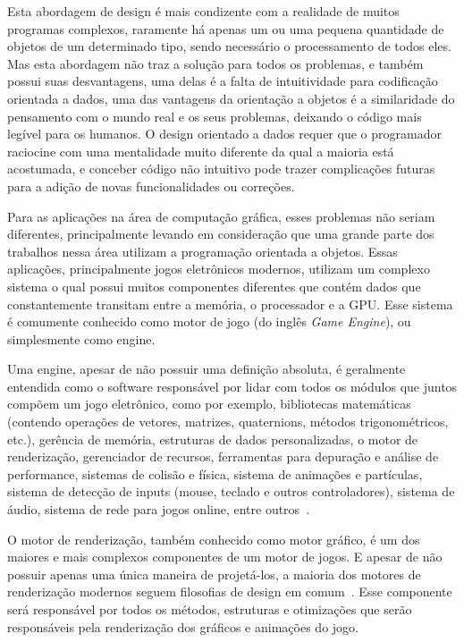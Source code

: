 \documentclass[11pt]{article}
\begin{document}
Esta abordagem de design é mais condizente com a realidade de muitos programas complexos, raramente há apenas um ou uma pequena 
quantidade de objetos de um determinado tipo, sendo necessário o processamento de todos eles. Mas esta abordagem não traz a 
solução para todos os problemas, e também possui suas desvantagens, uma delas é a falta de intuitividade para codificação 
orientada a dados, uma das vantagens da orientação a objetos é a similaridade do pensamento com o mundo real e os seus 
problemas, deixando o código mais legível para os humanos. O design orientado a dados requer que o programador raciocine com 
uma mentalidade muito diferente da qual a maioria está acostumada, e conceber código não intuitivo pode trazer complicações 
futuras para a adição de novas funcionalidades ou correções.

Para as aplicações na área de computação gráfica, esses problemas não seriam diferentes, principalmente levando em 
consideração que uma grande parte dos trabalhos nessa área utilizam a programação orientada a objetos. Essas aplicações, 
principalmente jogos eletrônicos modernos, utilizam um complexo sistema o qual possui muitos componentes diferentes que 
contém dados que constantemente transitam entre a memória, o processador e a GPU. Esse sistema é comumente conhecido 
como motor de jogo (do inglês \textit{Game Engine}), ou simplesmente como engine.

Uma engine, apesar de não possuir uma definição absoluta, é geralmente entendida como o software responsável por lidar com 
todos os módulos que juntos compõem um jogo eletrônico, como por exemplo, bibliotecas matemáticas (contendo operações de vetores, 
matrizes, quaternions, métodos trigonométricos, etc.), gerência de memória, 
estruturas de dados personalizadas, o motor de renderização, gerenciador de recursos, ferramentas para depuração e análise de performance, sistemas 
de colisão e física, sistema de animações e partículas, sistema de detecção de inputs (mouse, teclado e outros controladores),
sistema de áudio, sistema de rede para jogos online, entre outros~\cite{gregory2009game}.

O motor de renderização, também conhecido como motor gráfico, é um dos maiores e mais complexos componentes de um motor de 
jogos. E apesar de não possuir apenas uma única maneira de projetá-los, a maioria dos motores de renderização modernos 
seguem filosofias de design em comum~\cite{gregory2009game}. Esse componente será responsável por todos os métodos, 
estruturas e otimizações que serão responsáveis pela renderização dos gráficos e animações do jogo. 
\end{document}
